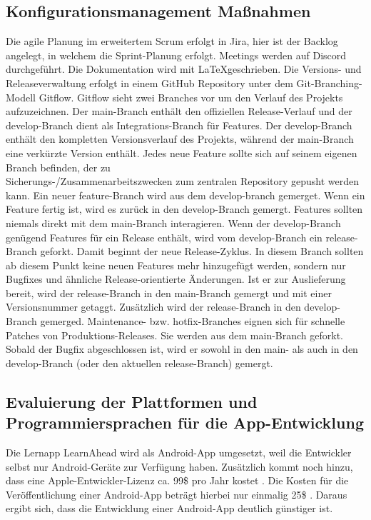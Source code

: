 \subsection{Konfigurationsmanagement Maßnahmen}
Die agile Planung im erweitertem Scrum erfolgt in Jira, hier ist der Backlog angelegt, in welchem die Sprint-Planung erfolgt. Meetings werden auf Discord durchgeführt. Die Dokumentation wird mit \LaTeX  geschrieben.\newline
Die Versions- und Releaseverwaltung erfolgt in einem GitHub Repository unter dem Git-Branching-Modell Gitflow. Gitflow sieht zwei Branches vor um den Verlauf des Projekts aufzuzeichnen. Der main-Branch enthält den offiziellen Release-Verlauf und der develop-Branch dient als Integrations-Branch für Features. Der develop-Branch enthält den kompletten Versionsverlauf des Projekts, während der main-Branch eine verkürzte Version enthält.\newline
Jedes neue Feature sollte sich auf seinem eigenen Branch befinden, der zu \\ Sicherungs-/Zusammenarbeitszwecken zum zentralen Repository gepusht werden kann. Ein neuer feature-Branch  wird aus dem develop-branch gemerget. Wenn ein Feature fertig ist, wird es zurück in den develop-Branch gemergt. Features sollten niemals direkt mit dem main-Branch interagieren.\newline
Wenn der develop-Branch genügend Features für ein Release enthält, wird vom develop-Branch ein release-Branch geforkt. Damit beginnt der neue Release-Zyklus. In diesem Branch sollten ab diesem Punkt keine neuen Features mehr hinzugefügt werden, sondern nur Bugfixes und ähnliche Release-orientierte Änderungen. Ist er zur Auslieferung bereit, wird der release-Branch in den main-Branch gemergt und mit einer Versionsnummer getaggt. Zusätzlich wird der release-Branch in den develop-Branch gemerged. \newline
Maintenance- bzw. hotfix-Branches eignen sich für schnelle Patches von Produktions-Releases. Sie werden aus dem main-Branch geforkt. Sobald der Bugfix abgeschlossen ist, wird er sowohl in den main- als auch in den develop-Branch (oder den aktuellen release-Branch) gemergt.
\subsection{Evaluierung der Plattformen und Programmiersprachen für die App-Entwicklung
}
Die Lernapp LearnAhead wird als Android-App umgesetzt, weil die Entwickler selbst nur Android-Geräte zur Verfügung haben. Zusätzlich kommt noch hinzu, dass eine Apple-Entwickler-Lizenz ca. 99\$ pro Jahr kostet \cite{noauthor_registrierung_nodate}. Die Kosten für die Veröffentlichung einer Android-App beträgt hierbei nur einmalig 25\$ \cite {appsoluts_unterschied_2016}. Daraus ergibt sich, dass die Entwicklung einer Android-App deutlich günstiger ist. \\

